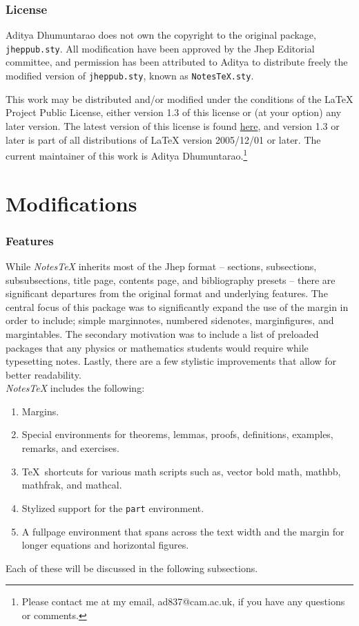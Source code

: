 \documentclass[10pt]{article}
\begin{document}
	\section{License}\label{Sec:License}
	Aditya Dhumuntarao does not own the copyright to the original package, \texttt{jheppub.sty}. All modification have been approved by the Jhep Editorial committee, and permission has been attributed to Aditya to distribute freely the modified version of \texttt{jheppub.sty}, known as \texttt{NotesTeX.sty}.

	This work may be distributed and/or modified under the conditions of the LaTeX Project Public License, either version 1.3 of this license or (at your option) any later version. The latest version of this license is found \href{http://www.latex-project.org/lppl.txt}{here}, and version 1.3 or later is part of all distributions of LaTeX version 2005/12/01 or later. The current maintainer of this work is Aditya Dhumuntarao.\footnote{Please contact me at my email, ad837@cam.ac.uk, if you have any questions or comments.}

	\newpage

	\part{Modifications}\label{Part:Modification}
	\section{Features}\label{Sub:Features}
	While \textit{NotesTeX} inherits most of the Jhep format -- sections, subsections, subsubsections, title page, contents page, and bibliography presets -- there are significant departures from the original format and underlying features. The central focus of this package was to significantly expand the use of the margin in order to include; simple marginnotes, numbered sidenotes, marginfigures, and margintables. The secondary motivation was to include a list of preloaded packages that any physics or mathematics students would require while typesetting notes. Lastly, there are a few stylistic improvements that allow for better readability.\\

	\noindent \textit{NotesTeX} includes the following:
	\begin{enumerate}
		\item Margins.
		\item Special environments for theorems, lemmas, proofs, definitions, examples, remarks, and exercises.
		\item \TeX\ shortcuts for various math scripts such as, vector bold math, mathbb, mathfrak, and mathcal.
		\item Stylized support for the \texttt{part} environment.
		\item A fullpage environment that spans across the text width and the margin for longer equations and horizontal figures.
	\end{enumerate}
	Each of these will be discussed in the following subsections.
\end{document}
